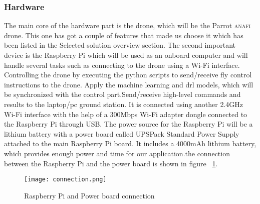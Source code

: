\documentclass[../main.tex]{subfiles}
\begin{document}
    \subsubsection{Hardware}
    The main core of the hardware part is the drone, which will be the Parrot \textsc{anafi} drone. This one has got a couple of features that made us choose it which has been listed in the Selected solution overview section. The second important device is the Raspberry Pi which will be used as an onboard computer and will handle several tasks such as connecting to the drone using a Wi-Fi interface. Controlling the drone by executing the python scripts to send/receive fly control instructions to the drone. Apply the machine learning and \gls{drl} models, which will be synchronized with the control part.Send/receive high-level commands and results to the laptop/pc ground station. It is connected using another 2.4GHz Wi-Fi interface with the help of a 300Mbps Wi-Fi adapter dongle connected to the Raspberry Pi through USB. The power source for the Raspberry Pi will be a lithium battery with a power board called UPSPack Standard Power Supply attached to the main Raspberry Pi board. It includes a 4000mAh lithium battery, which provides enough power and time for our application.the connection between the Raspberry Pi and the power board is shown in figure ~\ref{Fig3:connection}.
    \begin{figure}[H]
        \centering
        \texttt{[image: connection.png]}
        \caption{Raspberry Pi and Power board connection}\label{Fig3:connection}
    \end{figure}     

    
\end{document}
